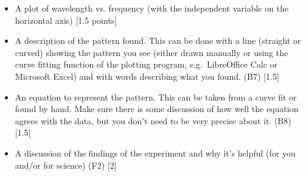 \begin{steps}
\begin{itemize}
		\item A plot of wavelength vs. frequency (with the independent variable on the horizontal axis) [1.5 points]
		
		\item A description of the pattern found. This can be done with a line (straight or curved) showing the pattern you see (either drawn manually or using the curve fitting function of the plotting program, e.g.\ LibreOffice Calc or Microsoft Excel) and with words describing what you found. (B7) [1.5]
		
		\item An equation to represent the pattern. This can be taken from a curve fit or found by hand. Make sure there is some discussion of how well the equation agrees with the data, but you don't need to be very precise about it. (B8) [1.5]
		
		\item A discussion of the findings of the experiment and why it's helpful (for you and/or for science) (F2) [2]
	\end{itemize}

\end{steps}

%
%
%	
%	
%	
%	
%	
%	
%	

